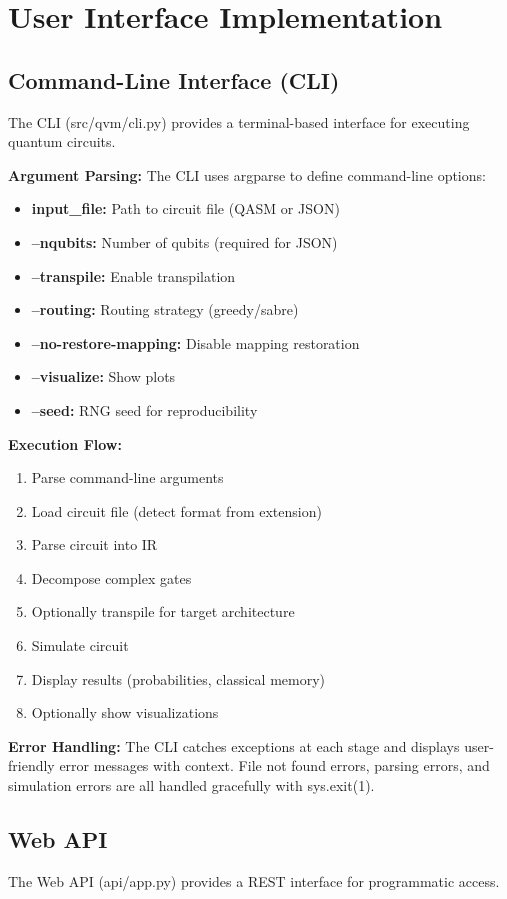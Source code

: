 \section{User Interface Implementation}

\subsection{Command-Line Interface (CLI)}
The CLI (src/qvm/cli.py) provides a terminal-based interface for executing quantum circuits.

\textbf{Argument Parsing:}
The CLI uses argparse to define command-line options:
\begin{itemize}
\item \textbf{input\_file:} Path to circuit file (QASM or JSON)
\item \textbf{--nqubits:} Number of qubits (required for JSON)
\item \textbf{--transpile:} Enable transpilation
\item \textbf{--routing:} Routing strategy (greedy/sabre)
\item \textbf{--no-restore-mapping:} Disable mapping restoration
\item \textbf{--visualize:} Show plots
\item \textbf{--seed:} RNG seed for reproducibility
\end{itemize}

\textbf{Execution Flow:}
\begin{enumerate}
\item Parse command-line arguments
\item Load circuit file (detect format from extension)
\item Parse circuit into IR
\item Decompose complex gates
\item Optionally transpile for target architecture
\item Simulate circuit
\item Display results (probabilities, classical memory)
\item Optionally show visualizations
\end{enumerate}

\textbf{Error Handling:}
The CLI catches exceptions at each stage and displays user-friendly error messages with context. File not found errors, parsing errors, and simulation errors are all handled gracefully with sys.exit(1).

\subsection{Web API}
The Web API (api/app.py) provides a REST interface for programmatic access.

